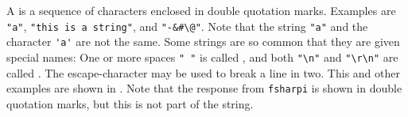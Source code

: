 \documentclass[fsharpNotes.tex]{subfiles}
\begin{document}
A  is a sequence of characters enclosed in double quotation marks.  Examples are \lstinline{"a"}, \lstinline{"this is a string"}, and \lstinline{"-&#\@"}. Note that the string \lstinline{"a"} and the character \lstinline{'a'} are not the same. Some strings are so common that they are given special names: One or more spaces \lstinline{" "} is called , and both \lstinline{"\n"} and \lstinline{"\r\n"} are called .  The escape-character \lexeme{\\} may be used to break a line in two. This and other examples are shown in .
%
%
Note that the response from \lstinline[language=console]{fsharpi} is shown in double quotation marks, but this is not part of the string. 
\end{document}
